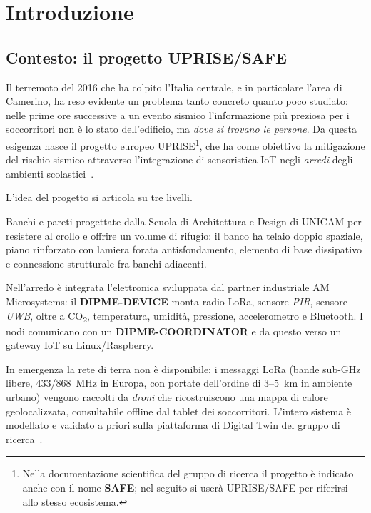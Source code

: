 \chapter{Introduzione}
\label{cap:introduzione}

\section{Contesto: il progetto UPRISE/SAFE}
\label{sec:contesto}

Il terremoto del 2016 che ha colpito l'Italia centrale, e in particolare l'area di
Camerino, ha reso evidente un problema tanto concreto quanto poco studiato: nelle
prime ore successive a un evento sismico l'informazione più preziosa per i
soccorritori non è lo stato dell'edificio, ma \emph{dove si trovano le persone}.
Da questa esigenza nasce il progetto europeo UPRISE\footnote{Nella documentazione
scientifica del gruppo di ricerca il progetto è indicato anche con il nome
\textbf{SAFE}; nel seguito si userà UPRISE/SAFE per riferirsi allo stesso
ecosistema.}, che ha come obiettivo la mitigazione del rischio sismico attraverso
l'integrazione di sensoristica IoT negli \emph{arredi} degli ambienti
scolastici~\cite{slideUprise}.

L'idea del progetto si articola su tre livelli.

\begin{description}[leftmargin=1.4em,style=nextline]
  \item[Arredi salva-vita] Banchi e pareti progettate dalla Scuola di Architettura
    e Design di UNICAM per resistere al crollo e offrire un volume di rifugio: il
    banco ha telaio doppio spaziale, piano rinforzato con lamiera forata
    antisfondamento, elemento di base dissipativo e connessione strutturale fra
    banchi adiacenti.
  \item[Nodi di sensing] Nell'arredo è integrata l'elettronica sviluppata dal
    partner industriale AM Microsystems: il \textbf{DIPME-DEVICE} monta radio LoRa,
    sensore \emph{PIR}, sensore \emph{UWB}, oltre a CO\textsubscript{2},
    temperatura, umidità, pressione, accelerometro e Bluetooth. I nodi
    comunicano con un \textbf{DIPME-COORDINATOR} e da questo verso un gateway IoT
    su Linux/Raspberry.
  \item[Raccolta e visualizzazione] In emergenza la rete di terra non è
    disponibile: i messaggi LoRa (bande sub-GHz libere, 433/868~MHz in Europa,
    con portate dell'ordine di 3--5~km in ambiente urbano) vengono raccolti da
    \emph{droni} che ricostruiscono una mappa di calore geolocalizzata, consultabile
    offline dal tablet dei soccorritori. L'intero sistema è modellato e validato
    a priori sulla piattaforma di Digital Twin del gruppo di
    ricerca~\cite{callisto2023dt,unicamDT}.
\end{description}

